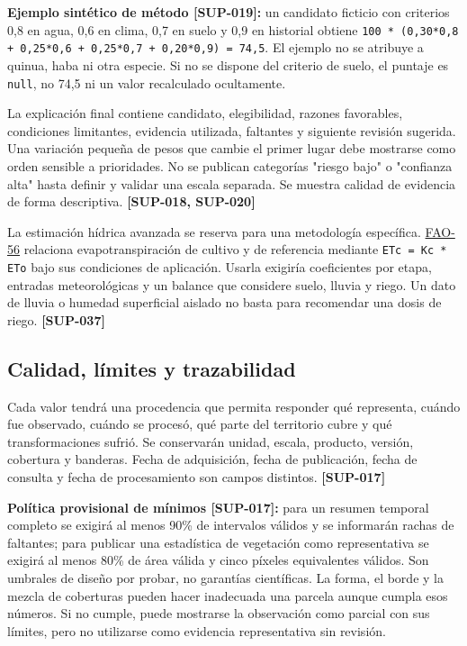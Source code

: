 \documentclass[10pt,a4paper]{article}
\begin{document}
\textbf{Ejemplo sintético de método [SUP-019]:} un candidato ficticio con criterios 0,8 en agua, 0,6 en clima, 0,7 en suelo y 0,9 en historial obtiene \texttt{100 * (0,30*0,8 + 0,25*0,6 + 0,25*0,7 + 0,20*0,9) = 74,5}. El ejemplo no se atribuye a quinua, haba ni otra especie. Si no se dispone del criterio de suelo, el puntaje es \texttt{null}, no 74,5 ni un valor recalculado ocultamente.


La explicación final contiene candidato, elegibilidad, razones favorables, condiciones limitantes, evidencia utilizada, faltantes y siguiente revisión sugerida. Una variación pequeña de pesos que cambie el primer lugar debe mostrarse como orden sensible a prioridades. No se publican categorías "riesgo bajo" o "confianza alta" hasta definir y validar una escala separada. Se muestra calidad de evidencia de forma descriptiva. \textbf{[SUP-018, SUP-020]}


La estimación hídrica avanzada se reserva para una metodología específica. \href{https://www.fao.org/4/X0490E/x0490e0a.htm}{FAO-56} relaciona evapotranspiración de cultivo y de referencia mediante \texttt{ETc = Kc * ETo} bajo sus condiciones de aplicación. Usarla exigiría coeficientes por etapa, entradas meteorológicas y un balance que considere suelo, lluvia y riego. Un dato de lluvia o humedad superficial aislado no basta para recomendar una dosis de riego. \textbf{[SUP-037]}


\subsection{Calidad, límites y trazabilidad}

Cada valor tendrá una procedencia que permita responder qué representa, cuándo fue observado, cuándo se procesó, qué parte del territorio cubre y qué transformaciones sufrió. Se conservarán unidad, escala, producto, versión, cobertura y banderas. Fecha de adquisición, fecha de publicación, fecha de consulta y fecha de procesamiento son campos distintos. \textbf{[SUP-017]}


\textbf{Política provisional de mínimos [SUP-017]:} para un resumen temporal completo se exigirá al menos 90\% de intervalos válidos y se informarán rachas de faltantes; para publicar una estadística de vegetación como representativa se exigirá al menos 80\% de área válida y cinco píxeles equivalentes válidos. Son umbrales de diseño por probar, no garantías científicas. La forma, el borde y la mezcla de coberturas pueden hacer inadecuada una parcela aunque cumpla esos números. Si no cumple, puede mostrarse la observación como parcial con sus límites, pero no utilizarse como evidencia representativa sin revisión.
\end{document}
